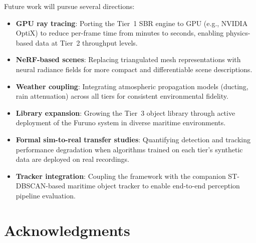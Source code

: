 \documentclass[conf]{new-aiaa}
\begin{document}
Future work will pursue several directions:
\begin{itemize}
    \item \textbf{GPU ray tracing}: Porting the Tier~1 SBR engine to GPU (e.g., NVIDIA OptiX) to reduce per-frame time from minutes to seconds, enabling physics-based data at Tier~2 throughput levels.
    \item \textbf{NeRF-based scenes}: Replacing triangulated mesh representations with neural radiance fields for more compact and differentiable scene descriptions.
    \item \textbf{Weather coupling}: Integrating atmospheric propagation models (ducting, rain attenuation) across all tiers for consistent environmental fidelity.
    \item \textbf{Library expansion}: Growing the Tier~3 object library through active deployment of the Furuno system in diverse maritime environments.
    \item \textbf{Formal sim-to-real transfer studies}: Quantifying detection and tracking performance degradation when algorithms trained on each tier's synthetic data are deployed on real recordings.
    \item \textbf{Tracker integration}: Coupling the framework with the companion ST-DBSCAN-based maritime object tracker to enable end-to-end perception pipeline evaluation.
\end{itemize}

\section*{Acknowledgments}


\end{document}
